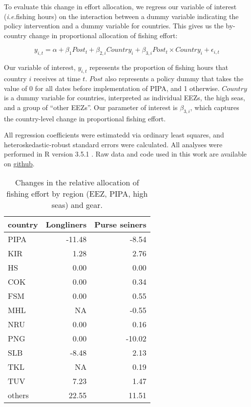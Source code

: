 \documentclass[12pt,]{article}
\begin{document}
To evaluate this change in effort allocation, we regress our variable of
interest (\emph{i.e.}fishing hours) on the interaction between a dummy
variable indicating the policy intervention and a dummy variable for
countries. This gives us the by-country change in proportional
allocation of fishing effort:

\[
y_{i,t} = \alpha + \beta_1Post_t + \beta_{2,i}Country_i + \beta_{3,i}Post_t \times Country_i + \epsilon_{i,t}
\]

Our variable of interest, \(y_{i,t}\) represents the proportion of
fishing hours that country \(i\) receives at time \(t\). \(Post\) also
represents a policy dummy that takes the value of 0 for all dates before
implementation of PIPA, and 1 otherwise. \(Country\) is a dummy variable
for countries, interpreted as individual EEZs, the high seas, and a
group of ``other EEZs''. Our parameter of interest is \(\beta_{3,i}\),
which captures the country-level change in proportional fishing effort.

All regression coefficients were estimatedd via ordinary least squares,
and heteroskedastic-robust standard errors were calculated. All analyses
were performed in R version 3.5.1 \citep{rcore_2018}. Raw data and code
used in this work are available on
\href{https://github.com/jcvdav/MPA_displacement}{github}.

\begin{table}[H]

\caption{\label{tab:unnamed-chunk-8}\label{tab:ba_disp}Changes in the relative allocation of fishing effort by region (EEZ, PIPA, high seas) and gear.}
\centering
\begin{tabular}[t]{lrr}
\toprule
country & Longliners & Purse seiners\\
\midrule
PIPA & -11.48 & -8.54\\
KIR & 1.28 & 2.76\\
HS & 0.00 & 0.00\\
COK & 0.00 & 0.34\\
FSM & 0.00 & 0.55\\
\addlinespace
MHL & NA & -0.55\\
NRU & 0.00 & 0.16\\
PNG & 0.00 & -10.02\\
SLB & -8.48 & 2.13\\
TKL & NA & 0.19\\
\addlinespace
TUV & 7.23 & 1.47\\
others & 22.55 & 11.51\\
\bottomrule
\end{tabular}
\end{table}
\end{document}

